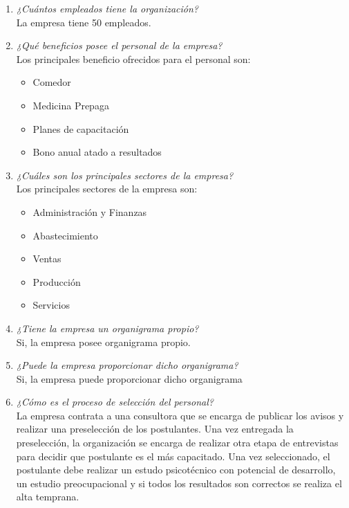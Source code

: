 \documentclass[a4paper,10pt]{article}
\begin{document}
		
			\begin{enumerate}[resume]

			\item \textit{¿Cuántos empleados tiene la organización?}\\
			La empresa tiene 50 empleados.
				
			\item \textit{¿Qué beneficios posee el personal de la empresa?}\\
			Los principales beneficio ofrecidos para el personal son:
			\begin{itemize}
				\item Comedor
				\item Medicina Prepaga
				\item Planes de capacitación
				\item Bono anual atado a resultados				
			\end{itemize}
			
			\item \textit{¿Cuáles son los principales sectores de la empresa?}\\
			Los principales sectores de la empresa son:
			\begin{itemize}
				\item Administración y Finanzas
				\item Abastecimiento
				\item Ventas
				\item Producción
				\item Servicios
			\end{itemize}
			
			\item \textit{¿Tiene la empresa un organigrama propio?}\\
			Si, la empresa posee organigrama propio.
					
			\item \textit{¿Puede la empresa proporcionar dicho organigrama?}\\
			Si, la empresa puede proporcionar dicho organigrama
			
			\item \textit{¿Cómo es el proceso de selección del personal? }\\
			La empresa contrata a una consultora que se encarga de publicar los avisos y realizar una preselección de los postulantes. Una vez entregada la preselección, la organización se encarga de realizar otra etapa de entrevistas para decidir que postulante es el más capacitado. Una vez seleccionado, el postulante debe realizar un estudo psicotécnico con potencial de desarrollo, un estudio preocupacional y si todos los resultados son correctos se realiza el alta temprana.


\end{enumerate}
\end{document}
